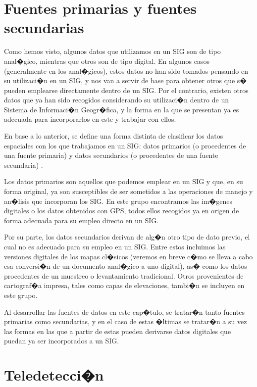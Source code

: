 \section{Fuentes primarias y fuentes secundarias}

Como hemos visto, algunos datos que utilizamos en un SIG son de tipo anal�gico, mientras que otros son de tipo digital. En algunos casos (generalmente en los anal�gicos), estos datos no han sido tomados pensando en su utilizaci�n en un SIG, y nos van a servir de base para obtener otros que s� pueden emplearse directamente dentro de un SIG. Por el contrario, existen otros datos que ya han sido recogidos considerando su utilizaci�n dentro de un Sistema de Informaci�n Geogr�fica, y la forma en la que se presentan ya es adecuada para incorporarlos en este y trabajar con ellos.

En base a lo anterior, se define una forma distinta de clasificar los datos espaciales con los que trabajamos en un SIG: datos primarios (o procedentes de una fuente primaria) y datos secundarios (o procedentes de una fuente secundaria) \cite{Jackson1991Longman}.

Los datos primarios son aquellos que podemos emplear en un SIG y que, en su forma original, ya son susceptibles de ser sometidos a las operaciones de manejo y an�lisis que incorporan los SIG. En este grupo encontramos las im�genes digitales o los datos obtenidos con GPS, todos ellos recogidos ya en origen de forma adecuada para su empleo directo en un SIG.

Por su parte, los datos secundarios derivan de alg�n otro tipo de dato previo, el cual no es adecuado para su empleo en un SIG. Entre estos incluimos las versiones digitales de los mapas cl�sicos (veremos en breve c�mo se lleva a cabo esa conversi�n de un documento anal�gico a uno digital), as� como los datos procedentes de un muestreo o levantamiento tradicional. Otros provenientes de cartograf�a impresa, tales como capas de elevaciones, tambi�n se incluyen en este grupo.

Al desarrollar las fuentes de datos en este cap�tulo, se tratar�n tanto fuentes primarias como secundarias, y en el caso de estas �ltimas se tratar�n a su vez las formas en las que a partir de estas pueden derivarse datos digitales que puedan ya ser incorporados a un SIG.

\section{Teledetecci�n}


